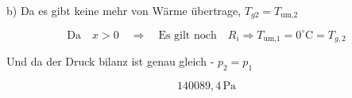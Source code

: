 b) Da es gibt keine mehr von Wärme übertrage, \( T_{g2} = T_{\text{um,2}} \)

\[
\text{Da} \quad x > 0 \quad \Rightarrow \quad \text{Es gilt noch} \quad R_i \Rightarrow \boxed{T_{\text{um,1}} = 0^\circ \text{C} = T_{g,2}}
\]

Und da der Druck bilanz ist genau gleich - \( p_2 = p_1 \)

\[
\boxed{140089,4 \, \text{Pa}}
\]
